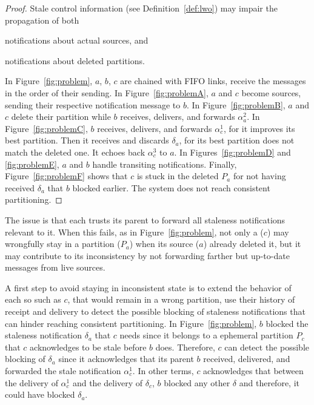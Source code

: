 \begin{proof}
Stale control information (see Definition~\ref{def:lwo}) may impair
the propagation of both
\begin{inparaenum}[(i)]
\item notifications about actual sources, and
\item notifications about deleted partitions.
\end{inparaenum}
In Figure~\ref{fig:problem}, $a$, $b$, $c$ are chained with FIFO links, \ie \processes
receive the messages in the order of their sending. %
In Figure~\ref{fig:problemA}, $a$ and $c$ become sources, sending
their respective notification message to $b$. In
Figure~\ref{fig:problemB}, $a$ and $c$ delete their partition while
$b$ receives, delivers, and forwards $\alpha_a^2$. In
Figure~\ref{fig:problemC}, $b$ receives, delivers, and forwards
$\alpha_c^1$, for it improves its best partition. Then it receives and
discards $\delta_a$, for its best partition does not match the deleted
one. It echoes back $\alpha_c^3$ to $a$. In Figures~\ref{fig:problemD}
and \ref{fig:problemE}, $a$ and $b$ handle transiting
notifications. Finally, Figure~\ref{fig:problemF} shows that $c$ is stuck
in the deleted $P_a$ for not having received $\delta_a$ that
$b$ blocked earlier. The system does not reach consistent
partitioning. \end{proof}



The issue is that each \process trusts its parent to forward all
staleness notifications relevant to it. When this fails, as in
Figure~\ref{fig:problem}, not only a \process ($c$) may wrongfully
stay in a partition ($P_a$) when its source ($a$) already deleted it,
but it may contribute to its inconsistency by not forwarding farther
but up-to-date messages from live sources.

A first step to avoid staying in inconsistent state is to extend the
behavior of each \process so \processes such as $c$, that would remain
in a wrong partition, use their history of receipt and delivery to
detect the possible blocking of staleness notifications that can
hinder reaching consistent partitioning.  In Figure~\ref{fig:problem},
$b$ blocked the staleness notification $\delta_a$ that $c$ needs since
it belongs to a ephemeral partition $P_c$ that $c$ acknowledges to be
stale before $b$ does. Therefore, $c$ can detect the possible blocking
of $\delta_a$ since it acknowledges that its parent $b$ received,
delivered, and forwarded the stale notification $\alpha_c^1$. In other
terms, $c$ acknowledges that between the delivery of $\alpha_c^1$ and
the delivery of $\delta_c$, $b$ blocked any other $\delta$ and
therefore, it could have blocked $\delta_a$.

